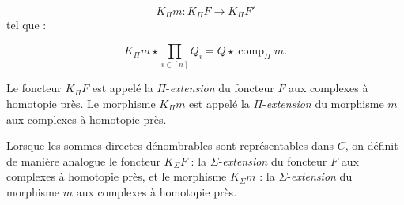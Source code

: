 \begin{equation}
  K_{\Pi}m\colon K_{\Pi}F\longrightarrow K_{\Pi}F'
  \tag{2.5.10.3}
\end{equation}
tel que :

\begin{equation}
  K_{\Pi}m\star\prod_{i\in[n]}Q_i
  =Q\star\operatorname{comp}_{\Pi}m.
  \tag{2.5.10.4}
\end{equation}

Le foncteur $K_{\Pi}F$ est appelé la $\Pi$-\emph{extension} du foncteur $F$
aux complexes à homotopie près. Le morphisme $K_{\Pi}m$ est appelé la
$\Pi$-\emph{extension} du morphisme $m$ aux complexes à homotopie près.

Lorsque les sommes directes dénombrables sont représentables dans $C$, on
définit de manière analogue le foncteur $K_{\Sigma}F$ : la
$\Sigma$-\emph{extension} du foncteur $F$ aux complexes à homotopie près, et
le morphisme $K_{\Sigma}m$ : la $\Sigma$-\emph{extension} du morphisme $m$
aux complexes à homotopie près.
